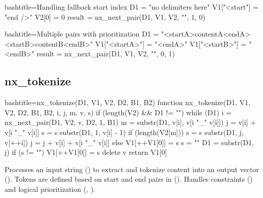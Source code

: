 \begin{NexCodeBox}{bash}{title={Handling fallback start index}}
	D1 = "no delimiters here"
	V1["<start"] = "end />"
	V2[0] = 0
	result = nx_next_pair(D1, V1, V2, "", 1, 0)
\end{NexCodeBox}

\begin{NexCodeBox}{bash}{title={Multiple pairs with prioritization}}
	D1 = "<startA>contentA<endA><startB>contentB<endB>"
	V1["<startA>"] = "<endA>"
	V1["<startB>"] = "<endB>"
	result = nx_next_pair(D1, V1, V2, "", 0, 1)
\end{NexCodeBox}

\newpage
\subsection{nx_tokenize}
\label{nx_tokenize}
\begin{NexCodeBox}{bash}{title={nx_tokenize(D1, V1, V2, D2, B1, B2)}}
function nx_tokenize(D1, V1, V2, D2, B1, B2, i, j, m, v, s) {
	if (length(V2) && D1 != "") {
		while (D1) {
			i = nx_next_pair(D1, V2, v, D2, 1, B1)
			m = substr(D1, v[i], v[i "_" v[i]])
			j = v[i] + v[i "_" v[i]]
			s = s substr(D1, 1, v[i] - 1)
			if (length(V2[m])) {
				s = s substr(D1, j, v[++i])
				j = j + v[i] + v[i "_" v[i]]
			} else {
				V1[++V1[0]] = s
				s = ""
			}
			D1 = substr(D1, j)
		}
		if (s != "")
			V1[++V1[0]] = s
		delete v
		return V1[0]
	}
}
\end{NexCodeBox}

\begin{NexMainBox}
	\begin{NexMainBox}
		Processes an input string () to extract and tokenize content into an output vector (). Tokens are defined based on start and end pairs in (). Handles constraints () and logical prioritization (, ).
	\end{NexMainBox}
	\begin{NexMainBox}
		\begin{NexListDark}
		\end{NexListDark}
	\end{NexMainBox}
\end{NexMainBox}

